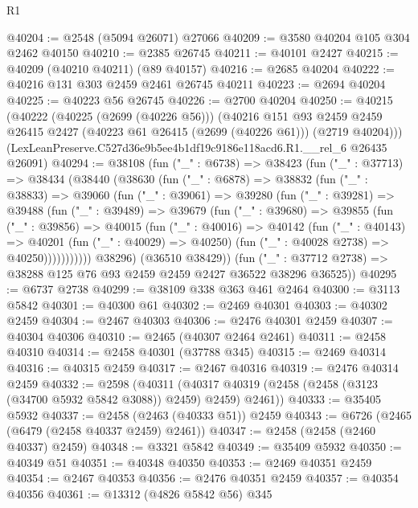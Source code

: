 \begin{lexlean}{R1}
\begin{coremodule}
@40204 := @2548 (@5094 @26071) @27066
@40209 := @3580 @40204 @105 @304 @2462 @40150
@40210 := @2385 @26745
@40211 := @40101 @2427
@40215 := @40209 (@40210 @40211) (@89 @40157)
@40216 := @2685 @40204
@40222 := @40216 @131 @303 @2459 @2461 @26745 @40211
@40223 := @2694 @40204
@40225 := @40223 @56 @26745
@40226 := @2700 @40204
@40250 := @40215
    (@40222
      (@40225 (@2699 (@40226 @56)))
      (@40216
        @151
        @93
        @2459
        @2459
        @26415
        @2427
        (@40223 @61 @26415 (@2699 (@40226 @61)))
        (@2719 @40204)))
    (LexLeanPreserve.C527d36e9b5ee4b1df19c9186e118acd6.R1.__rel_6 @26435 @26091)
@40294 := @38108
    (fun ("_" : @6738) =>
    @38423
      (fun ("_" : @37713) =>
      @38434
        (@38440
          (@38630
            (fun ("_" : @6878) =>
            @38832
              (fun ("_" : @38833) =>
              @39060
                (fun ("_" : @39061) =>
                @39280
                  (fun ("_" : @39281) =>
                  @39488
                    (fun ("_" : @39489) =>
                    @39679
                      (fun ("_" : @39680) =>
                      @39855
                        (fun ("_" : @39856) =>
                        @40015
                          (fun ("_" : @40016) =>
                          @40142
                            (fun ("_" : @40143) =>
                            @40201
                              (fun ("_" : @40029) => @40250)
                              (fun ("_" : @40028 @2738) => @40250)))))))))))
          @38296)
        (@36510 @38429))
      (fun ("_" : @37712 @2738) => @38288 @125 @76 @93 @2459 @2459 @2427 @36522 @38296 @36525))
@40295 := @6737 @2738
@40299 := @38109 @338 @363 @461 @2464
@40300 := @3113 @5842
@40301 := @40300 @61
@40302 := @2469 @40301
@40303 := @40302 @2459
@40304 := @2467 @40303
@40306 := @2476 @40301 @2459
@40307 := @40304 @40306
@40310 := @2465 (@40307 @2464 @2461)
@40311 := @2458 @40310
@40314 := @2458 @40301 (@37788 @345)
@40315 := @2469 @40314
@40316 := @40315 @2459
@40317 := @2467 @40316
@40319 := @2476 @40314 @2459
@40332 := @2598
    (@40311 (@40317 @40319 (@2458 (@2458 (@3123 (@34700 @5932 @5842 @3088)) @2459) @2459) @2461))
@40333 := @35405 @5932
@40337 := @2458 (@2463 (@40333 @51)) @2459
@40343 := @6726 (@2465 (@6479 (@2458 @40337 @2459) @2461))
@40347 := @2458 (@2458 (@2460 @40337) @2459)
@40348 := @3321 @5842
@40349 := @35409 @5932
@40350 := @40349 @51
@40351 := @40348 @40350
@40353 := @2469 @40351 @2459
@40354 := @2467 @40353
@40356 := @2476 @40351 @2459
@40357 := @40354 @40356
@40361 := @13312 (@4826 @5842 @56) @345

\end{coremodule}
\end{lexlean}
